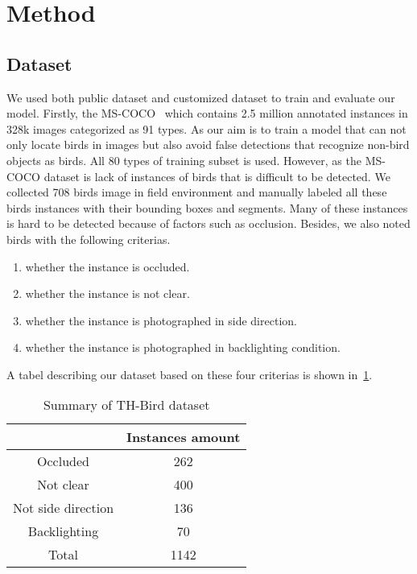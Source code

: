 \section{Method}
\subsection{Dataset}
We used both public dataset and customized dataset to train and evaluate our model.
Firstly, the MS-COCO~\cite{datasetcoco} which contains 2.5 million annotated 
instances in 328k images categorized as 91 types. As our aim is to train a model that 
can not only locate birds in images but also avoid false detections that recognize 
non-bird objects as birds. All 80 types of training subset is used. However, as 
the MS-COCO dataset is lack of instances of birds that is difficult to be detected.
We collected 708 birds image in field environment and manually labeled all these birds 
instances with their bounding boxes and segments. Many of these instances is hard to be 
detected because of factors such as occlusion. Besides, we also noted birds with the 
following criterias.
\begin{enumerate}
    \item whether the instance is occluded.
    \item whether the instance is not clear.
    \item whether the instance is photographed in side direction.
    \item whether the instance is photographed in backlighting condition.
\end{enumerate}
A tabel describing our dataset based on these four criterias is shown in~\ref{th-bird-table}.
\begin{table}[H]
    \centering  %
    \captionsetup{justification=centering}  %
    \begin{tabular}{|c|c|}
    \hline
                       & Instances amount \\ \hline
    Occluded           & 262              \\ \hline
    Not clear          & 400              \\ \hline
    Not side direction & 136              \\ \hline
    Backlighting       & 70               \\ \hline
    Total              & 1142             \\ \hline
    \end{tabular}
    \caption{Summary of TH-Bird dataset}
    \label{th-bird-table}
\end{table}
